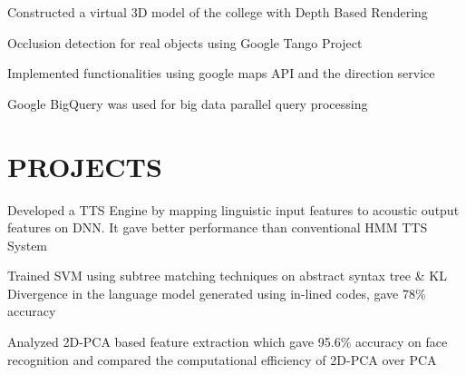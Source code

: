 \documentclass[]{deedy-resume-openfont}
\begin{document}
\begin{minipage}[t]{0.66\textwidth}
\begin{tightemize}
\item Constructed a virtual 3D model of the college with Depth Based Rendering
\item Occlusion detection for real objects using Google Tango Project 
\end{tightemize}
\sectionsep

\begin{tightemize}
\item Implemented functionalities using google maps API and the direction service 
\item Google BigQuery was used for big data parallel query processing
\end{tightemize}
\sectionsep


\section{PROJECTS}
\descript{}
Developed a TTS Engine by mapping linguistic input features to acoustic output features on DNN. It gave better performance than conventional HMM TTS System
\sectionsep

\descript{}
Trained SVM using subtree matching techniques on abstract syntax tree \& KL Divergence in the language model generated using in-lined codes, gave 78\% accuracy
\sectionsep

\descript{}
Analyzed 2D-PCA based feature extraction which gave 95.6\% accuracy on face recognition and compared the computational efficiency of 2D-PCA over PCA
\sectionsep



\end{minipage}
\end{document}
